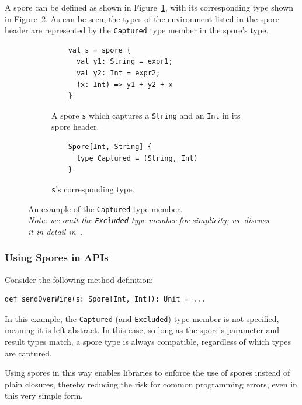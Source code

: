 \documentclass{easychair}
\begin{document}
A spore can be defined as shown in Figure~\ref{fig:captured-spore}, with its
corresponding type shown in Figure~\ref{fig:captured-type}. As can be seen,
the types of the environment listed in the spore header are
represented by the \verb|Captured| type member in the spore's type.

\begin{figure}[t!]
\begin{subfigure}{.5\textwidth}
  \centering
  \begin{lstlisting}
    val s = spore {
      val y1: String = expr1;
      val y2: Int = expr2;
      (x: Int) => y1 + y2 + x
    }
  \end{lstlisting}
  \caption{A spore \texttt{s} which captures a \texttt{String} and an \texttt{Int} in its spore header.}
  \label{fig:captured-spore}
\end{subfigure}%
\begin{subfigure}{.5\textwidth}
  \centering
  \begin{lstlisting}
    Spore[Int, String] {
      type Captured = (String, Int)
    }
  \end{lstlisting}
  \caption{\texttt{s}'s corresponding type.}
  \label{fig:captured-type}
\end{subfigure}%
\vspace{1mm}
\caption{An example of the \texttt{Captured} type member. \\\textit{Note: we omit the
\texttt{Excluded} type member for simplicity; we discuss it in detail in~\cite{MillerHO14}.}}
\label{fig:captured-ex}
\vspace{-5mm}
\end{figure}

\subsubsection{Using Spores in APIs}

Consider the following method definition:

\begin{lstlisting}[numbers=none]
    def sendOverWire(s: Spore[Int, Int]): Unit = ...
\end{lstlisting}
\noindent
In this example, the \verb|Captured| (and \verb|Excluded|) type
member is not specified, meaning it is left abstract. In this case, so long as
the spore's parameter and result types match, a spore type is always
compatible, regardless of which types are captured.

Using spores in this way enables libraries to enforce the use
of spores instead of plain closures, thereby reducing the risk for common
programming errors, even in this very simple form.
\end{document}

